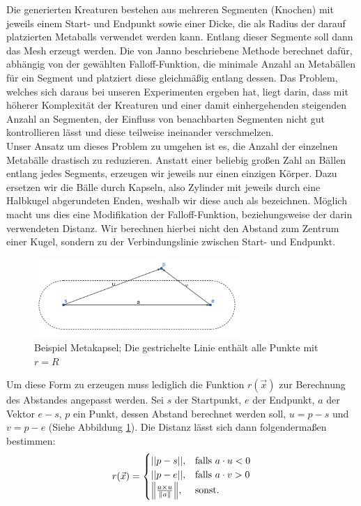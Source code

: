 Die generierten Kreaturen bestehen aus mehreren Segmenten (Knochen) mit jeweils einem Start- und Endpunkt sowie einer Dicke, die als Radius der darauf platzierten Metaballs verwendet werden kann. Entlang dieser Segmente soll dann das Mesh erzeugt werden. Die von Janno beschriebene Methode berechnet dafür, abhängig von der gewählten Falloff-Funktion, die minimale Anzahl an Metabällen für ein Segment und platziert diese gleichmäßig entlang dessen. Das Problem, welches sich daraus bei unseren Experimenten ergeben hat, liegt darin, dass mit höherer Komplexität der Kreaturen und einer damit einhergehenden steigenden Anzahl an Segmenten, der Einfluss von benachbarten Segmenten nicht gut kontrollieren lässt und diese teilweise ineinander verschmelzen. \\

Unser Ansatz um dieses Problem zu umgehen ist es, die Anzahl der einzelnen Metabälle drastisch zu reduzieren. Anstatt einer beliebig großen Zahl an Bällen entlang jedes Segments, erzeugen wir jeweils nur einen einzigen Körper. Dazu ersetzen wir die Bälle durch Kapseln, also Zylinder mit jeweils durch eine Halbkugel abgerundeten Enden, weshalb wir diese auch als \grqq{} bezeichnen. Möglich macht uns dies eine Modifikation der Falloff-Funktion, beziehungsweise der darin verwendeten Distanz. Wir berechnen hierbei nicht den Abstand zum Zentrum einer Kugel, sondern zu der Verbindungslinie zwischen Start- und Endpunkt. \\

\begin{figure}[ht]
	\centering
	\includegraphics[width=0.7\textwidth]{resources/img/metacapsule.png}
	\caption{Beispiel Metakapsel; Die gestrichelte Linie enthält alle Punkte mit $r=R$}
	\label{metacapsule}
\end{figure}

Um diese Form zu erzeugen muss lediglich die Funktion $r(\vec{x})$ zur Berechnung des Abstandes angepasst werden.
Sei $s$ der Startpunkt, $e$ der Endpunkt, $a$ der Vektor $e-s$, $p$ ein Punkt, dessen Abstand berechnet werden soll, $u=p-s$ und $v=p-e$ (Siehe Abbildung \ref{metacapsule}). Die Distanz lässt sich dann folgendermaßen bestimmen:
\[
	r(\vec{x})=
	\begin{cases}
		||p-s||,                            & \text{falls } a\cdot u < 0 \\
		||p-e||,                            & \text{falls } a\cdot v > 0 \\
		\norm*{\frac{a\times u}{\norm{a}}}, & \text{sonst}.
	\end{cases}
\]

